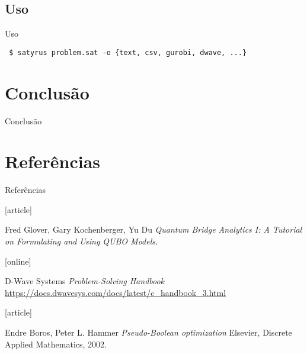 \documentclass[brazil, MathSerif, aspectratio = 169]{beamer}
\begin{document}
    \subsection{Uso}
    \begin{frame}%
        {Uso}

        \texttt{%
            \$ satyrus problem.sat -o \{text, csv, gurobi, dwave, ...\}%
        }

    \end{frame}

    \section{Conclusão}
    \begin{frame}{Conclusão}
        
    \end{frame}

    \section*{Referências}
    \begin{frame}%
        {Referências}

        \begin{thebibliography}{}

            [article]

            Fred Glover, Gary Kochenberger, Yu Du
            \newblock \emph{Quantum Bridge Analytics I: A Tutorial on Formulating and Using QUBO Models.}




            [online]

            D-Wave Systems
            \newblock \emph{Problem-Solving Handbook}
            \newblock \url{https://docs.dwavesys.com/docs/latest/c_handbook_3.html}

            [article]

            Endre Boros, Peter L. Hammer
            \newblock \emph{Pseudo-Boolean optimization}
            \newblock Elsevier, Discrete Applied Mathematics, 2002.
        \end{thebibliography}
    \end{frame}
\end{document}
